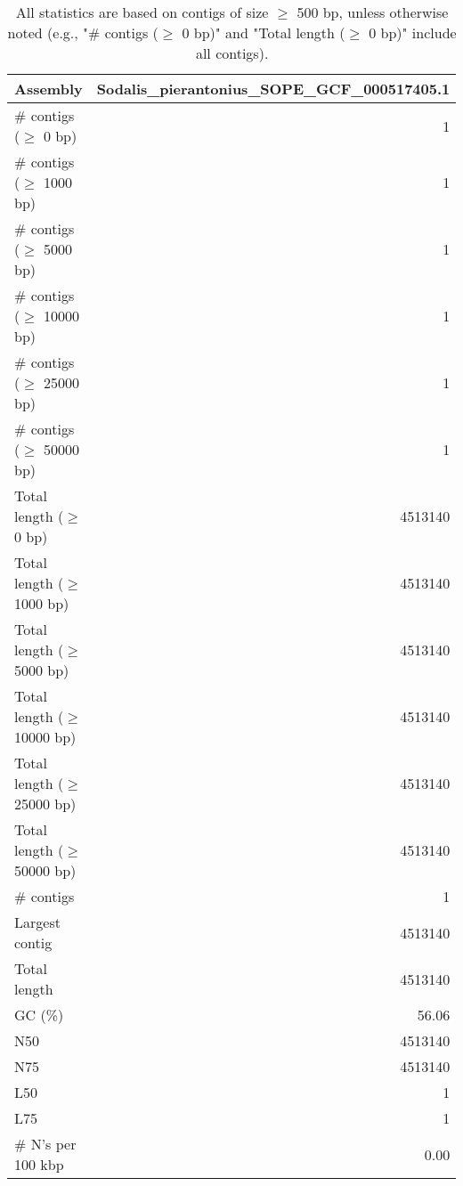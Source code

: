 \documentclass[12pt,a4paper]{article}
\begin{document}
\begin{table}[ht]
\begin{center}
\caption{All statistics are based on contigs of size $\geq$ 500 bp, unless otherwise noted (e.g., "\# contigs ($\geq$ 0 bp)" and "Total length ($\geq$ 0 bp)" include all contigs).}
\begin{tabular}{|l*{1}{|r}|}
\hline
Assembly & Sodalis\_pierantonius\_SOPE\_GCF\_000517405.1 \\ \hline
\# contigs ($\geq$ 0 bp) & 1 \\ \hline
\# contigs ($\geq$ 1000 bp) & 1 \\ \hline
\# contigs ($\geq$ 5000 bp) & 1 \\ \hline
\# contigs ($\geq$ 10000 bp) & 1 \\ \hline
\# contigs ($\geq$ 25000 bp) & 1 \\ \hline
\# contigs ($\geq$ 50000 bp) & 1 \\ \hline
Total length ($\geq$ 0 bp) & 4513140 \\ \hline
Total length ($\geq$ 1000 bp) & 4513140 \\ \hline
Total length ($\geq$ 5000 bp) & 4513140 \\ \hline
Total length ($\geq$ 10000 bp) & 4513140 \\ \hline
Total length ($\geq$ 25000 bp) & 4513140 \\ \hline
Total length ($\geq$ 50000 bp) & 4513140 \\ \hline
\# contigs & 1 \\ \hline
Largest contig & 4513140 \\ \hline
Total length & 4513140 \\ \hline
GC (\%) & 56.06 \\ \hline
N50 & 4513140 \\ \hline
N75 & 4513140 \\ \hline
L50 & 1 \\ \hline
L75 & 1 \\ \hline
\# N's per 100 kbp & 0.00 \\ \hline
\end{tabular}
\end{center}
\end{table}
\end{document}
